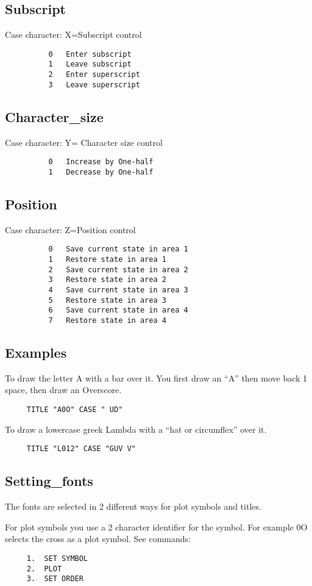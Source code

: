 \subsection{Subscript}
Case character:  
X=Subscript control 
\begin{verbatim}
          0   Enter subscript
          1   Leave subscript
          2   Enter superscript
          3   Leave superscript
\end{verbatim}
\subsection{Character\_size}
Case character:  
Y= Character size control 
\begin{verbatim}
          0   Increase by One-half 
          1   Decrease by One-half 
\end{verbatim}
\subsection{Position}
Case character:  
Z=Position control 
\begin{verbatim}
          0   Save current state in area 1
          1   Restore state in area 1
          2   Save current state in area 2
          3   Restore state in area 2
          4   Save current state in area 3
          5   Restore state in area 3
          6   Save current state in area 4
          7   Restore state in area 4
\end{verbatim}
\subsection{Examples}
To draw the letter A with a bar over it.  You first draw an ``A'' then move
back 1 space, then draw an Overscore.  
\begin{verbatim}
     TITLE "A0O" CASE " UD" 
\end{verbatim}
To draw a lowercase greek Lambda with a ``hat or circumflex'' over it.  
\begin{verbatim}
     TITLE "L012" CASE "GUV V" 
\end{verbatim}
\subsection{Setting\_fonts}
The fonts are selected in 2 different ways for plot symbols and titles.  

For  plot  symbols  you use a 2 character identifier for the symbol.  For
example 0O selects the cross as a plot symbol.  See commands:  
\begin{verbatim}
     1.  SET SYMBOL 
     2.  PLOT 
     3.  SET ORDER 
\end{verbatim}

